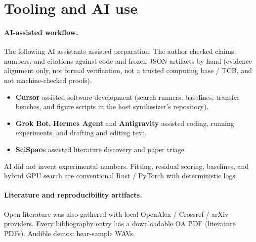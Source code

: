\section{Tooling and AI use}
\label{sec:tooling}

\paragraph{AI-assisted workflow.}
The following AI assistants assisted preparation.
The author checked claims, numbers, and citations against code and frozen JSON artifacts by hand
(evidence alignment only, not formal verification, not a trusted computing base / TCB, and not machine-checked proofs).
\begin{itemize}
  \item \textbf{Cursor} assisted software development (search runners, baselines, transfer benches, and figure scripts in the host synthesizer's repository).
  \item \textbf{Grok Bot}, \textbf{Hermes Agent} and \textbf{Antigravity} assisted coding, running experiments, and drafting and editing text.
  \item \textbf{SciSpace} assisted literature discovery and paper triage.
\end{itemize}
AI did not invent experimental numbers.
Fitting, residual scoring, baselines, and hybrid GPU search are conventional Rust / PyTorch with deterministic logs.

\paragraph{Literature and reproducibility artifacts.}
Open literature was also gathered with local OpenAlex / Crossref / arXiv providers. Every bibliography entry has a downloadable OA PDF
(literature PDFs).
Audible demos:
hear-sample WAVs.
